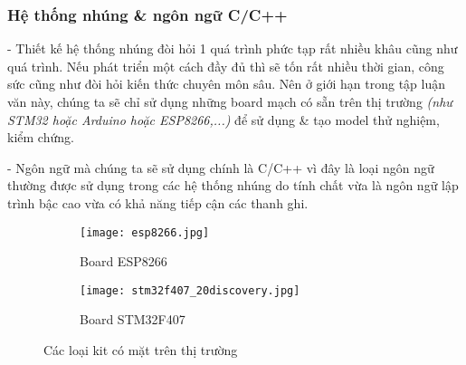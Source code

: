 	\subsubsection{Hệ thống nhúng \& ngôn ngữ C/C++}
	- Thiết kế hệ thống nhúng đòi hỏi 1 quá trình phức tạp rất nhiều khâu cũng như quá trình. Nếu phát triển một cách đầy đủ thì sẽ tốn rất nhiều thời gian, công sức cũng như đòi hỏi kiến thức chuyên môn sâu. Nên ở giới hạn trong tập luận văn này, chúng ta sẽ chỉ sử dụng những board mạch có sẵn trên thị trường \textit{(như STM32 hoặc Arduino hoặc ESP8266,...)} để sử dụng \& tạo model thử nghiệm, kiểm chứng.
	
	- Ngôn ngữ mà chúng ta sẽ sử dụng chính là C/C++ vì đây là loại ngôn ngữ thường được sử dụng trong các hệ thống nhúng do tính chất vừa là ngôn ngữ lập trình bậc cao vừa có khả năng tiếp cận các thanh ghi. 
	
\begin{figure}[H]
\begin{subfigure}{0.5\textwidth}
	\texttt{[image: esp8266.jpg]} 
	\caption{Board ESP8266}
\end{subfigure}
\begin{subfigure}{0.5\textwidth}
	\texttt{[image: stm32f407\_20discovery.jpg]}
	\caption{Board STM32F407}
\end{subfigure}
\caption{Các loại kit có mặt trên thị trường}	
\end{figure}
	